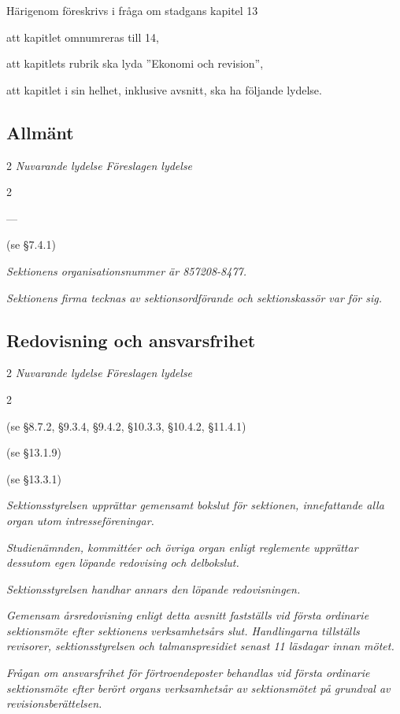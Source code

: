 \documentclass{article}
\newenvironment{lydelse}
    {\begin{paracol}{2}%
        \emph{Nuvarande lydelse}%
        \switchcolumn%
        \emph{Föreslagen lydelse}%
    \end{paracol}%
    \begin{enumerate}[label=\thesubsection.\arabic*]%
    \begin{paracol}{2}%
    }{\end{paracol}\end{enumerate}}
\begin{document}
Härigenom föreskrivs i fråga om stadgans kapitel 13
\begin{dels}
  \item att kapitlet omnumreras till 14,
  \item att kapitlets rubrik ska lyda ''Ekonomi och revision'',
  \item att kapitlet i sin helhet, inklusive avsnitt, ska ha följande lydelse.
\end{dels}

\subsection{Allmänt}
\begin{lydelse}
  \item[] ---

  \item[] (se \S 7.4.1)
  
  \switchcolumn

  \item \emph{Sektionens organisationsnummer är 857208-8477.}

  \item \emph{Sektionens firma tecknas av sektionsordförande och sektionskassör var för sig.}
  \label{S:EkonomiSektFirma}
\end{lydelse}

\subsection{Redovisning och ansvarsfrihet} \label{14.x:redovisning}
\begin{lydelse}
  \item[] (se \S 8.7.2, \S 9.3.4, \S 9.4.2, \S 10.3.3, \S 10.4.2, \S 11.4.1)
  \item[] (se \S 13.1.9)
  \item[] (se \S 13.3.1)
  \switchcolumn
  \setcounter{enumi}{0}  
  \item \emph{Sektionsstyrelsen upprättar gemensamt bokslut för sektionen, innefattande alla organ utom intresseföreningar.}
  \item \emph{Studienämnden, kommittéer och övriga organ enligt reglemente upprättar dessutom egen löpande redovising och delbokslut.}
  \label{S:RedovisningKont}
  \item \emph{Sektionsstyrelsen handhar annars den löpande redovisningen.}
  \item \emph{Gemensam årsredovisning enligt detta avsnitt fastställs vid första ordinarie sektionsmöte efter sektionens verksamhetsårs slut.
      Handlingarna tillställs revisorer, sektionsstyrelsen och talmanspresidiet senast 11 läsdagar innan mötet.} \label{14.x:tillställa}
  \item \emph{Frågan om ansvarsfrihet för förtroendeposter behandlas vid första ordinarie sektionsmöte efter berört organs verksamhetsår av sektionsmötet på grundval av revisionsberättelsen.}
\end{lydelse}
\end{document}
